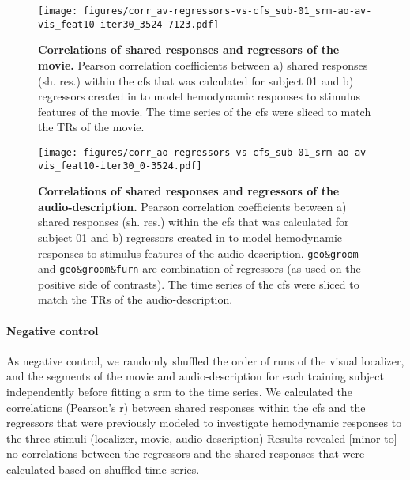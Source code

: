 \begin{figure*}[tbp]
\centering
    \texttt{[image: figures/corr\_av-regressors-vs-cfs\_sub-01\_srm-ao-av-vis\_feat10-iter30\_3524-7123.pdf]}
    \caption{
    \textbf{Correlations of shared responses and regressors of the movie.}
    Pearson correlation coefficients between a) shared responses (sh. res.)
    within the \ac{cfs} that was calculated for subject 01 and b) regressors
    created in \citet{haeusler2022processing} to model hemodynamic responses to
    stimulus features of the movie.
    The time series of the \ac{cfs} were sliced to match the TRs of the
    movie.
    }
    \label{fig:corr-av-reg-srm}
\end{figure*}



\begin{figure*}[tbp]
\centering
    \texttt{[image: figures/corr\_ao-regressors-vs-cfs\_sub-01\_srm-ao-av-vis\_feat10-iter30\_0-3524.pdf]}
    \caption{
    \textbf{Correlations of shared responses and regressors of the audio-description.}
    Pearson correlation coefficients between a) shared responses (sh. res.)
    within the \ac{cfs} that was calculated for subject 01 and b) regressors
    created in \citet{haeusler2022processing} to model hemodynamic responses to
    stimulus features of the audio-description.
    \texttt{geo\&groom} and \texttt{geo\&groom\&furn} are combination of
    regressors (as used on the positive side of contrasts).
    The time series of the \ac{cfs} were sliced to match the TRs of the
    audio-description.
    }
    \label{fig:corr-ao-reg-srm}
\end{figure*}



\paragraph{Negative control}
As negative control, we randomly shuffled the order of runs of the visual
localizer, and the segments of the movie and audio-description for each training
subject independently before fitting a \ac{srm} to the time series.
We calculated the correlations (Pearson's r) between shared responses within the
\ac{cfs} and the regressors that were previously modeled
\citep{sengupta2016extension, haeusler2022processing} to investigate hemodynamic
responses to the three stimuli (localizer, movie, audio-description)
Results revealed [minor to] no correlations between the regressors and the
shared responses that were calculated based on shuffled time series.



